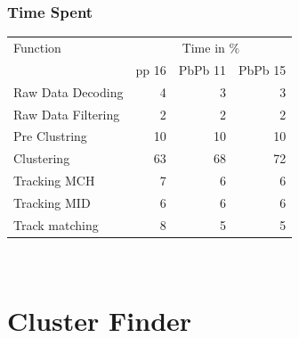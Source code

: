 \documentclass{beamer}
\begin{document}
\begin{frame}
  \frametitle{Time Spent}

\begin{tabular}{|l|r|r|r|}
  Function & \multicolumn{3}{c}{Time in \%} \\  
  & pp 16  & PbPb 11 & PbPb 15\\ \hline 
Raw Data Decoding & 4 & 3&3\\
Raw Data Filtering & 2 & 2&2\\
Pre Clustring & 10 & 10&10\\
Clustering & 63 & 68& 72\\
Tracking MCH & 7 & 6&6 \\
Tracking MID & 6 & 6&6 \\
Track matching & 8 &5 &5 \\
\end{tabular}\\
\vspace{2cm}
\end{frame}

\section{Cluster Finder}
\end{document}
